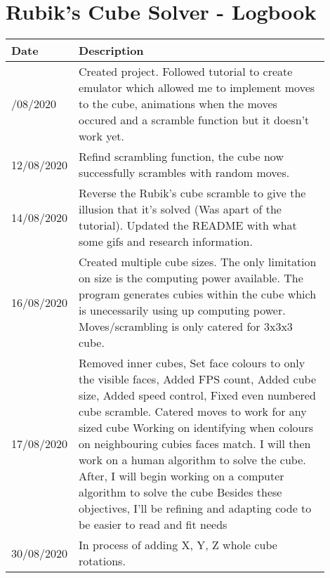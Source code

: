 \documentclass[12pt]{report} %
\begin{document}

\centering
\section*{Rubik's Cube Solver - Logbook}
\begin{table}[!ht]
    \centering
    \begin{tabular}{
        |>{\centering\arraybackslash}p{0.1\linewidth}
        |p{0.8\linewidth}|}
    \hline
    \textbf{Date} & \textbf{Description} \\ \hline
    10/08/2020   & 
    Created project. Followed tutorial to create emulator which allowed me to implement moves to the cube, animations when the moves occured and a scramble function but it doesn't work yet.            
    \\ \hline
    12/08/2020   &
    Refind scrambling function, the cube now successfully scrambles with random moves.
    \\ \hline
    14/08/2020  &
    Reverse the Rubik's cube scramble to give the illusion that it's solved (Was apart of the tutorial). Updated the README with what some gifs and research information.
    \\ \hline
    16/08/2020  &
    Created multiple cube sizes. The only limitation on size is the computing power available. The program generates cubies within the cube which is unecessarily using up computing power. Moves/scrambling is only catered for 3x3x3 cube.
    \\ \hline
    17/08/2020  &
    Removed inner cubes,   \newline
    Set face colours to only the visible faces,    \newline
    Added FPS count,   \newline
    Added cube size,   \newline
    Added speed control,   \newline
    Fixed even numbered cube scramble.   \newline
    Catered moves to work for any sized cube
    Working on identifying when colours on neighbouring cubies faces match.
    I will then work on a human algorithm to solve the cube.
    After, I will begin working on a computer algorithm to solve the cube
    Besides these objectives, I'll be refining and adapting code to be easier to read and fit needs
    \\ \hline
    30/08/2020  &
    In process of adding X, Y, Z whole cube rotations.

\end{tabular}
\end{table}
\end{document}
